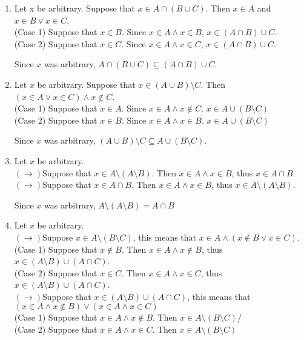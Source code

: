 \newcommand{\case}[1]{\\\hspace*{2em}(Case #1)}
\newcommand{\rdir}{\\$(\rightarrow)$}
\newcommand{\ldir}{\\$(\rightarrow)$}
\newcommand{\powerset}[1]{\mathscr{P}(#1)}

\begin{enumerate}
    \item
    Let x be arbitrary. Suppose that $x \in A \cap (B \cup C)$. Then $x \in A$ and $x \in B \lor x \in C$.
    \case{1} Suppose that $x \in B$. Since $x \in A \land x \in B$, $x \in (A \cap B) \cup C$.
    \case{2} Suppose that $x \in C$. Since $x \in A \land x \in C$, $x \in (A \cap B) \cup C$.
    
    Since $x$ was arbitrary, $A \cap (B \cup C) \subseteq (A \cap B) \cup C$.
    \item
    Let $x$ be arbitrary. Suppose that $x \in (A \cup B) \setminus C$. Then $(x \in A \lor x \in C) \land x \notin C$.
    \case{1} Suppose that $x \in A$. Since $x \in A \land x\notin C$. $x \in A \cup (B \setminus C)$
    \case{2} Suppose that $x \in B$. Since $x \in A \land x \in B$. $x \in A \cup (B \setminus C)$
    
    Since $x$ was arbitrary, $(A \cup B) \setminus C \subseteq A \cup (B \setminus C)$.
    \item
    Let $x$ be arbitrary.
    \rdir Suppose that $x \in A \setminus (A \setminus B)$. Then $x \in A \land x \in B$, thus $x \in A \cap B$.
    \ldir Suppose that $x \in A \cap B$. Then $x \in A \land x \in B$, thus $x \in A \setminus (A \setminus B)$.

    Since $x$ was arbitrary, $A \setminus (A \setminus B) = A \cap B$
    \item
    Let $x$ be arbitrary.
    \rdir Suppose $x \in A \setminus (B \setminus C)$, this means that $x \in A \land (x \notin B \lor x \in C)$.
    \case{1} Suppose that $x \notin B$. Then $x \in A \land x \notin B$, thus $x \in (A \setminus B) \cup (A \cap C)$.
    \case{2} Suppose that $x \in C$. Then $x \in A \land x \in C$, thus $x \in (A \setminus B) \cup (A \cap C)$.
    \ldir Suppose that $x \in (A \setminus B) \cup (A \cap C)$, this means that $(x \in A \land x \notin B) \lor (x \in A \land x \in C)$
    \case{1} Suppose that $x \in A \land x \notin B$. Then $x \in A \setminus (B \setminus C)$/
    \case{2} Suppose that $x \in A \land x \in C$. Then $x \in A \setminus (B \setminus C)$


\end{enumerate}
